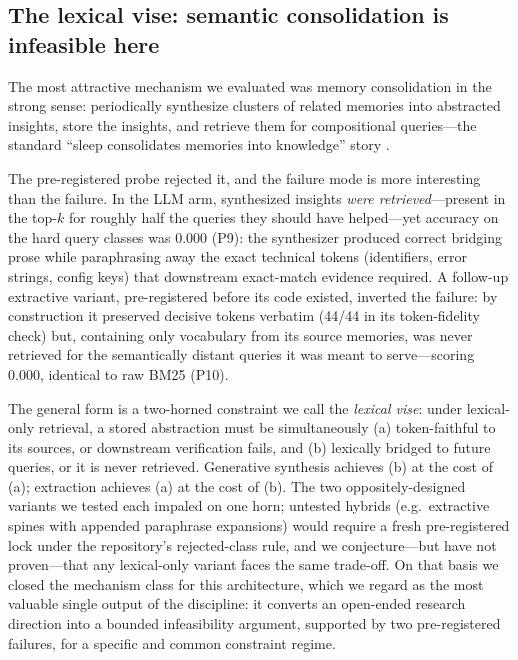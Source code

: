 \documentclass[11pt]{article}
\begin{document}
\subsection{The lexical vise: semantic consolidation is infeasible here}
\label{sec:vise}

The most attractive mechanism we evaluated was memory consolidation in the strong sense: periodically synthesize clusters of related memories into abstracted insights, store the insights, and retrieve them for compositional queries---the standard ``sleep consolidates memories into knowledge'' story \citep{yu2026memo}.

The pre-registered probe rejected it, and the failure mode is more interesting than the failure. In the LLM arm, synthesized insights \emph{were retrieved}---present in the top-$k$ for roughly half the queries they should have helped---yet accuracy on the hard query classes was 0.000 (P9): the synthesizer produced correct bridging prose while paraphrasing away the exact technical tokens (identifiers, error strings, config keys) that downstream exact-match evidence required. A follow-up extractive variant, pre-registered before its code existed, inverted the failure: by construction it preserved decisive tokens verbatim (44/44 in its token-fidelity check) but, containing only vocabulary from its source memories, was never retrieved for the semantically distant queries it was meant to serve---scoring 0.000, identical to raw BM25 (P10).

The general form is a two-horned constraint we call the \emph{lexical vise}: under lexical-only retrieval, a stored abstraction must be simultaneously (a) token-faithful to its sources, or downstream verification fails, and (b) lexically bridged to future queries, or it is never retrieved. Generative synthesis achieves (b) at the cost of (a); extraction achieves (a) at the cost of (b). The two oppositely-designed variants we tested each impaled on one horn; untested hybrids (e.g.\ extractive spines with appended paraphrase expansions) would require a fresh pre-registered lock under the repository's rejected-class rule, and we conjecture---but have not proven---that any lexical-only variant faces the same trade-off. On that basis we closed the mechanism class for this architecture, which we regard as the most valuable single output of the discipline: it converts an open-ended research direction into a bounded infeasibility argument, supported by two pre-registered failures, for a specific and common constraint regime.
\end{document}
